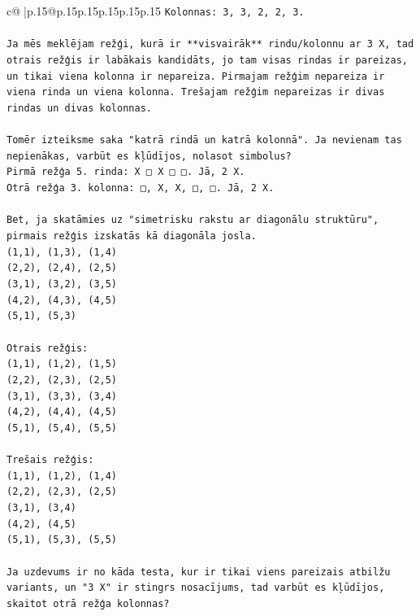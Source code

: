 \documentclass{article}
\begin{document}
{\begin{supertabular}{c@{$\;$}|p{.15\linewidth}@{}p{.15\linewidth}p{.15\linewidth}p{.15\linewidth}p{.15\linewidth}p{.15\linewidth}}
{{{\texttt{Kolonnas: 3, 3, 2, 2, 3.} \\
\\ 
\texttt{Ja mēs meklējam režģi, kurā ir **visvairāk** rindu/kolonnu ar 3 X, tad otrais režģis ir labākais kandidāts, jo tam visas rindas ir pareizas, un tikai viena kolonna ir nepareiza. Pirmajam režģim nepareiza ir viena rinda un viena kolonna. Trešajam režģim nepareizas ir divas rindas un divas kolonnas.} \\
\\ 
\texttt{Tomēr izteiksme saka "katrā rindā un katrā kolonnā". Ja nevienam tas nepienākas, varbūt es kļūdījos, nolasot simbolus?} \\
\texttt{Pirmā režģa 5. rinda: X □ X □ □. Jā, 2 X.} \\
\texttt{Otrā režģa 3. kolonna: □, X, X, □, □. Jā, 2 X.} \\
\\ 
\texttt{Bet, ja skatāmies uz "simetrisku rakstu ar diagonālu struktūru", pirmais režģis izskatās kā diagonāla josla.} \\
\texttt{(1,1), (1,3), (1,4)} \\
\texttt{(2,2), (2,4), (2,5)} \\
\texttt{(3,1), (3,2), (3,5)} \\
\texttt{(4,2), (4,3), (4,5)} \\
\texttt{(5,1), (5,3)} \\
\\ 
\texttt{Otrais režģis:} \\
\texttt{(1,1), (1,2), (1,5)} \\
\texttt{(2,2), (2,3), (2,5)} \\
\texttt{(3,1), (3,3), (3,4)} \\
\texttt{(4,2), (4,4), (4,5)} \\
\texttt{(5,1), (5,4), (5,5)} \\
\\ 
\texttt{Trešais režģis:} \\
\texttt{(1,1), (1,2), (1,4)} \\
\texttt{(2,2), (2,3), (2,5)} \\
\texttt{(3,1), (3,4)} \\
\texttt{(4,2), (4,5)} \\
\texttt{(5,1), (5,3), (5,5)} \\
\\ 
\texttt{Ja uzdevums ir no kāda testa, kur ir tikai viens pareizais atbilžu variants, un "3 X" ir stingrs nosacījums, tad varbūt es kļūdījos, skaitot otrā režģa kolonnas?} \\
}}}
\end{supertabular}}
\end{document}
